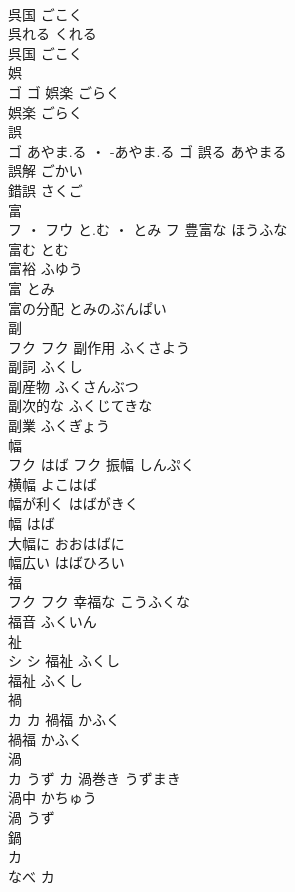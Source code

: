 \documentclass[8pt]{extreport}
\begin{document}
\begin{CJK}{UTF8}{min}
\\	呉国	ごこく	
\\	呉れる	くれる	
\\	呉国	ごこく	
\\	娯	
\\	ゴ		ゴ	娯楽	ごらく	
\\	娯楽	ごらく	
\\	誤	
\\	ゴ	あやま.る ・ -あやま.る	ゴ	誤る	あやまる	
\\	誤解	ごかい	
\\	錯誤	さくご	
\\	富	
\\	フ ・ フウ	と.む ・ とみ	フ	豊富な	ほうふな	
\\	富む	とむ	
\\	富裕	ふゆう	
\\	富	とみ	
\\	富の分配	とみのぶんぱい	
\\	副	
\\	フク		フク	副作用	ふくさよう	
\\	副詞	ふくし	
\\	副産物	ふくさんぶつ	
\\	副次的な	ふくじてきな	
\\	副業	ふくぎょう	
\\	幅	
\\	フク	はば	フク	振幅	しんぷく	
\\	横幅	よこはば	
\\	幅が利く	はばがきく	
\\	幅	はば	
\\	大幅に	おおはばに	
\\	幅広い	はばひろい	
\\	福	
\\	フク		フク	幸福な	こうふくな	
\\	福音	ふくいん	
\\	祉	
\\	シ		シ	福祉	ふくし	
\\	福祉	ふくし	
\\	禍	
\\	カ		カ	禍福	かふく	
\\	禍福	かふく	
\\	渦	
\\	カ	うず	カ	渦巻き	うずまき	
\\	渦中	かちゅう	
\\	渦	うず	
\\	鍋	
\\	カ
\\	なべ	カ

\end{CJK}
\end{document}
